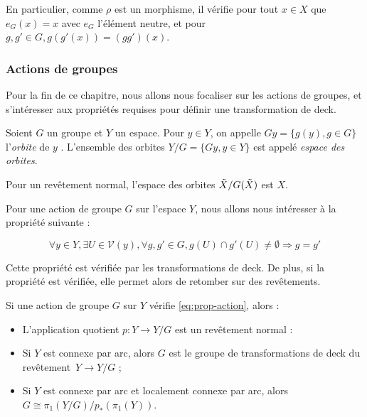 \begin{remark}
En particulier, comme $\rho$ est un morphisme, il vérifie pour tout $x\in X$ que $e_G(x)=x$ avec $e_G$ l'élément neutre, et pour $g,g'\in G, {g(g'(x))=(gg')(x)}$.
\end{remark}

\subsubsection{Actions de groupes}

Pour la fin de ce chapitre, nous allons nous focaliser sur les actions de groupes, et s'intéresser aux propriétés requises pour définir une transformation de deck.

\begin{definition}
Soient $G$ un groupe et $Y$ un espace. Pour $y\in Y$, on appelle $Gy=\{g(y),g\in G\}$ l'\emph{orbite} de $y$ . L'ensemble des orbites ${Y/G=\{Gy,y\in Y\}}$ est appelé \emph{espace des orbites}.
\end{definition}

\begin{exemple}
Pour un revêtement normal, l'espace des orbites $\Tilde{X}/G(\Tilde{X})$ est $X$.
\end{exemple}

Pour une action de groupe $G$ sur l'espace $Y$, nous allons nous intéresser à la propriété suivante :

\begin{equation}\label{eq:prop-action}
\forall y\in Y,\exists U\in\mathcal{V}(y),\forall g,g'\in G, g(U)\cap g'(U)\neq\emptyset\Longrightarrow g=g'
\end{equation}

Cette propriété est vérifiée par les transformations de deck. De plus, si la propriété est vérifiée, elle permet alors de retomber sur des revêtements. 

\begin{proposition}
Si une action de groupe $G$ sur $Y$ vérifie \eqref{eq:prop-action}, alors :\begin{itemize}
    \item L'application quotient $p:Y\to Y/G$ est un revêtement normal :
    \item Si $Y$ est connexe par arc, alors $G$ est le groupe de transformations de deck du revêtement~${Y\to Y/G}$ ;
    \item Si $Y$ est connexe par arc et localement connexe par arc, alors $G\cong\pi_1(Y/G)/p_\ast(\pi_1(Y))$.
\end{itemize}
\end{proposition}

